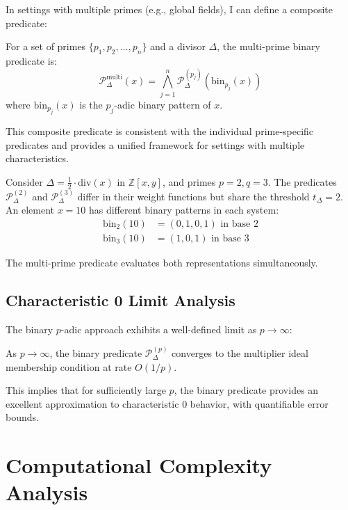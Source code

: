 In settings with multiple primes (e.g., global fields), I can define a composite predicate:

\begin{definition}
For a set of primes $\{p_1, p_2, \ldots, p_n\}$ and a divisor $\Delta$, the multi-prime binary predicate is:
$$\mathcal{P}_\Delta^{\text{multi}}(x) = \bigwedge_{j=1}^{n} \mathcal{P}_\Delta^{(p_j)}(\text{bin}_{p_j}(x))$$
where $\text{bin}_{p_j}(x)$ is the $p_j$-adic binary pattern of $x$.
\end{definition}

This composite predicate is consistent with the individual prime-specific predicates and provides a unified framework for settings with multiple characteristics.

\begin{example}
Consider $\Delta = \frac{1}{2} \cdot \text{div}(x)$ in $\mathbb{Z}[x,y]$, and primes $p=2, q=3$. The predicates $\mathcal{P}_\Delta^{(2)}$ and $\mathcal{P}_\Delta^{(3)}$ differ in their weight functions but share the threshold $t_\Delta = 2$. An element $x = 10$ has different binary patterns in each system:
\begin{align*}
\text{bin}_2(10) &= (0,1,0,1) \text{ in base 2} \\
\text{bin}_3(10) &= (1,0,1) \text{ in base 3}
\end{align*}

The multi-prime predicate evaluates both representations simultaneously.
\end{example}

\subsection{Characteristic 0 Limit Analysis}

The binary $p$-adic approach exhibits a well-defined limit as $p \to \infty$:

\begin{proposition}
As $p \to \infty$, the binary predicate $\mathcal{P}_\Delta^{(p)}$ converges to the multiplier ideal membership condition at rate $O(1/p)$.
\end{proposition}

This implies that for sufficiently large $p$, the binary predicate provides an excellent approximation to characteristic 0 behavior, with quantifiable error bounds.

\section{Computational Complexity Analysis}\label{app:computational-complexity}

